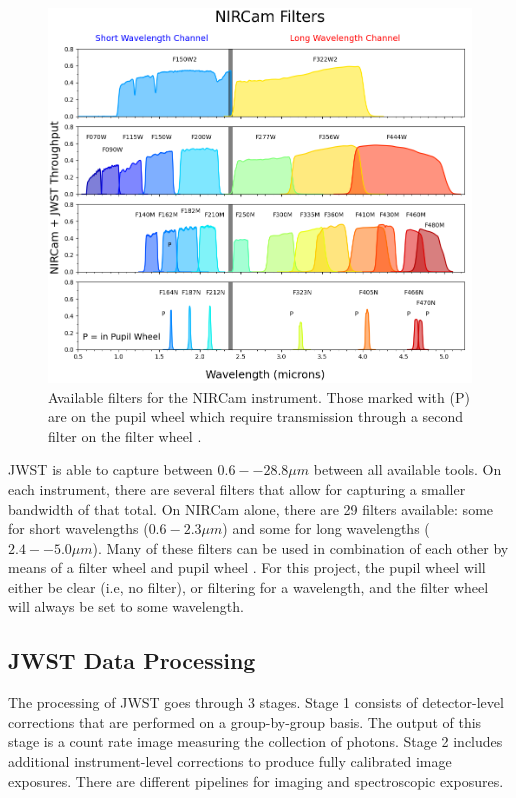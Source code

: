 \documentclass[10pt,twocolumn,letterpaper]{article}
\begin{document}
\begin{figure}[t]
  \centering
  \includegraphics[scale=0.33]{filters}
  \caption{Available filters for the NIRCam instrument. Those marked with (P) are on the pupil wheel which require transmission through a second filter on the filter wheel \cite{webbfilters}.}
  \label{fig:filters}
\end{figure}

JWST is able to capture between $0.6 -- 28.8\mu m$ between all available tools. On each instrument, there are several filters that allow for capturing a smaller bandwidth of that total.
On NIRCam alone, there are 29 filters available: some for short wavelengths ($0.6-2.3 \mu m$) and some for long wavelengths ($2.4 -- 5.0 \mu m$). Many of these filters can be used in combination of each other by means of a filter wheel and pupil wheel \cite{webbfilters}. 
For this project, the pupil wheel will either be clear (i.e, no filter), or filtering for a wavelength, and the filter wheel will always be set to some wavelength.

\subsection{JWST Data Processing}
The processing of JWST goes through 3 stages. Stage 1 consists of detector-level corrections that are performed on a group-by-group basis. The output of this stage is a count rate image measuring the collection of photons.
Stage 2 includes additional instrument-level corrections to produce fully calibrated image exposures. There are different pipelines for imaging and spectroscopic exposures.
\end{document}
